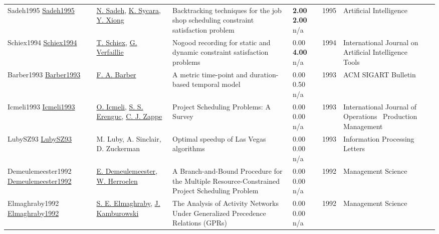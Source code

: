 {\begin{longtable}{p{3cm}p{5cm}p{10cm}p{1cm}rp{2.5cm}l}
Sadeh1995 \href{http://dx.doi.org/10.1016/0004-3702(95)00078-s}{Sadeh1995} & \hyperref[auth:a1581]{N. Sadeh}, \hyperref[auth:a1582]{K. Sycara}, \hyperref[auth:a1583]{Y. Xiong} & \cellcolor{gold!20}Backtracking techniques for the job shop scheduling constraint satisfaction problem & \noindent{}\textbf{2.00} \textbf{2.00} n/a & 1995 & Artificial Intelligence & \cite{Sadeh1995}\\
Schiex1994 \href{http://dx.doi.org/10.1142/s0218213094000108}{Schiex1994} & \hyperref[auth:a1721]{T. Schiex}, \hyperref[auth:a1722]{G. Verfaillie} & Nogood recording for static and dynamic constraint satisfaction problems & \noindent{}\textcolor{black!50}{0.00} \textbf{4.00} n/a & 1994 & International Journal on Artificial Intelligence Tools & \cite{Schiex1994}\\
Barber1993 \href{http://dx.doi.org/10.1145/152947.152955}{Barber1993} & \hyperref[auth:a1959]{F. A. Barber} & A metric time-point and duration-based temporal model & \noindent{}\textcolor{black!50}{0.00} 0.50 n/a & 1993 & ACM SIGART Bulletin & \cite{Barber1993}\\
Icmeli1993 \href{http://dx.doi.org/10.1108/01443579310046454}{Icmeli1993} & \hyperref[auth:a1553]{O. Icmeli}, \hyperref[auth:a1554]{S. S. Erenguc}, \hyperref[auth:a1723]{C. J. Zappe} & Project Scheduling Problems: A Survey & \noindent{}\textcolor{black!50}{0.00} \textcolor{black!50}{0.00} n/a & 1993 & International Journal of Operations \  Production Management & \cite{Icmeli1993}\\
LubySZ93 \href{http://dx.doi.org/10.1016/0020-0190(93)90029-9}{LubySZ93} & M. Luby, A. Sinclair, D. Zuckerman & Optimal speedup of Las Vegas algorithms & \noindent{}\textcolor{black!50}{0.00} \textcolor{black!50}{0.00} n/a & 1993 & Information Processing Letters & \cite{LubySZ93}\\
Demeulemeester1992 \href{http://dx.doi.org/10.1287/mnsc.38.12.1803}{Demeulemeester1992} & \hyperref[auth:a1090]{E. Demeulemeester}, \hyperref[auth:a1102]{W. Herroelen} & A Branch-and-Bound Procedure for the Multiple Resource-Constrained Project Scheduling Problem & \noindent{}\textcolor{black!50}{0.00} \textcolor{black!50}{0.00} n/a & 1992 & Management Science & \cite{Demeulemeester1992}\\
Elmaghraby1992 \href{http://dx.doi.org/10.1287/mnsc.38.9.1245}{Elmaghraby1992} & \hyperref[auth:a1773]{S. E. Elmaghraby}, \hyperref[auth:a1774]{J. Kamburowski} & The Analysis of Activity Networks Under Generalized Precedence Relations (GPRs) & \noindent{}\textcolor{black!50}{0.00} \textcolor{black!50}{0.00} n/a & 1992 & Management Science & \cite{Elmaghraby1992}\\

\end{longtable}}
